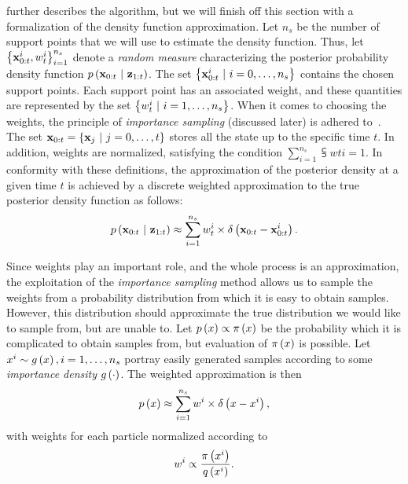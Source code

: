 \cite{Arulampalam2007} further describes the algorithm, but we will finish off this section with a formalization of the density function approximation. Let $n_s$ be the number of support points that we will use to estimate the density function. Thus, let ${\left\{ {{\mathbf{x}}_{0:t}^{i}, {w}_{t}^{i}} \right\}}_{i = 1}^{n_s}$ denote a \emph{random measure} characterizing the posterior probability density function $p \left( \mathbf{x}_{0:t} \ | \ \mathbf{z}_{1:t} \right)$. The set $\left\{ {{\mathbf{x}}_{0:t}^{i} \ | \ i = 0, \dots, n_s} \right\}$ contains the chosen support points. Each support point has an associated weight, and these quantities are represented by the set $\left\{ {{w}_{t}^{i} \ | \ i = 1, \dots, n_s} \right\}$. When it comes to choosing the weights, the principle of \emph{importance sampling} (discussed later) is adhered to~\cite{bergman1999recursive, stordal2008sequential}. The set $\vect{x}_{0:t} = \cbrackets{\vect{x}_j \ | \ j = 0, \dots, t}$ stores all the state up to the specific time $t$. In addition, weights are normalized, satisfying the condition $\sum_{i = 1}^{n_s} \subsup{w}{t}{i} = 1$. In conformity with these definitions, the approximation of the posterior density at a given time $t$ is achieved by a discrete weighted approximation to the true posterior density function as follows:
\begin{equation}
    p \left( \mathbf{x}_{0:t} \ | \ \mathbf{z}_{1:t} \right) \approx \sum_{i = 1}^{n_s} {w}_{t}^{i} \times {\delta} \left( \mathbf{x}_{0:t} - {\mathbf{x}}_{0:t}^{i} \right).
\end{equation}

Since weights play an important role, and the whole process is an approximation, the exploitation of the \emph{importance sampling} method allows us to sample the weights from a probability distribution from which it is easy to obtain samples. However, this distribution should approximate the true distribution we would like to sample from, but are unable to. Let $p \left( x \right) \propto {\pi} \left( x \right)$ be the probability which it is complicated to obtain samples from, but evaluation of ${\pi} \left( x \right)$ is possible. Let $x^i \sim {g} \left( x \right), i = 1, \dots, n_s$ portray easily generated samples according to some \emph{importance density} ${g} \left( \cdot \right)$. The weighted approximation is then
\begin{equation}
    p \left( x \right) \approx \sum_{i = 1}^{n_s} w^i \times {\delta} \left( x - x^i \right),
\end{equation}
with weights for each particle normalized according to
\begin{equation}
    w^i \propto \frac{{\pi} \left( x^i \right)}{{q} \left( x^i \right)}.
\end{equation}

